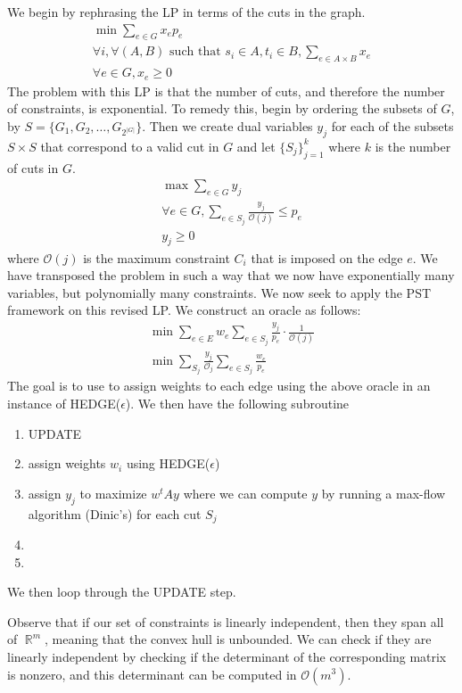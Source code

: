 \documentclass{article}
\DeclareMathOperator{\R}{\mathbb{R}}
\newcommand{\problem}[1]{\noindent {\bf #1}}
\newcommand{\problempart}[1]{\noindent{\textbf{(#1)}}}
\begin{document}
\problempart{b}
We begin by rephrasing the LP in terms of the cuts in the graph. 
\begin{align*}
\min \sum_{e \in G} x_ep_e \\
\forall i, \forall (A,B) \text{ such that } s_i \in A, t_i \in B, \sum_{e \in A \times B} x_e \\
\forall e \in G,  x_e \geq 0
\end{align*}
The problem with this LP is that the number of cuts, and therefore the number of constraints, is exponential. To remedy this, begin by ordering the subsets of $G$, by $S = \{G_1, G_2, \ldots, G_{2^{|G|}}\}$. Then we create dual variables $y_j$ for each of the subsets $S \times S$ that correspond to a valid cut in $G$ and let $\{S_j\}_{j=1}^k$ where $k$ is the number of cuts in $G$.  
\begin{align*}
\max \sum_{e \in G} y_j \\
\forall e \in G, \sum_{e \in S_j} \frac{y_j}{\mathcal{O}(j)} \leq p_e \\
y_j \geq 0 
\end{align*}
where $\mathcal{O}(j)$ is the maximum constraint $C_i$ that is imposed on the edge $e$. We have transposed the problem in such a way that we now have exponentially many variables, but polynomially many constraints. We now seek to apply the PST framework on this revised LP. We construct an oracle as follows:
\begin{align*}
\min \sum_{e\in E} w_e \sum_{e\in S_j} \frac{y_j}{p_e}\cdot \frac{1}{\mathcal{O}(j)} \\
\min \sum_{S_j} \frac{y_j}{\mathcal{O}_j} \sum_{e \in S_j} \frac{w_e}{p_e}
\end{align*}
The goal is to use to assign weights to each edge using the above oracle in an instance of HEDGE($\epsilon$). We then have the following subroutine

\begin{enumerate}
\item UPDATE
\item assign weights $w_i$ using HEDGE($\epsilon$)
\item assign $y_j$ to maximize $w^tAy$ where we can compute $y$ by running a max-flow algorithm (Dinic's) for each cut $S_j$
\item 
\item
\end{enumerate}
We then loop through the UPDATE step. 

\problem{Problem 3.}

\problempart{a} Observe that if our set of constraints is linearly independent, then they span all of $\R^m$, meaning that the convex hull is unbounded. We can check if they are linearly independent by checking if the determinant of the corresponding matrix is nonzero, and this determinant can be computed in $\mathcal{O}(m^3)$.
\end{document}
